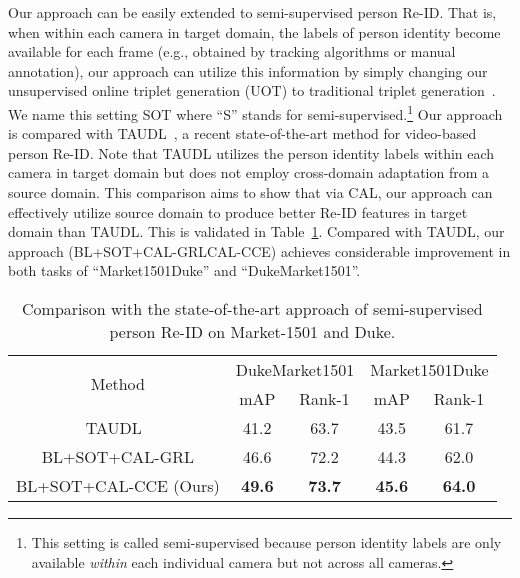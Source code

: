\documentclass[10pt,twocolumn,letterpaper]{article}
\begin{document}
Our approach can be easily extended to semi-supervised person Re-ID. That is, when within each camera in target domain, the labels of person identity become available for each frame (e.g., obtained by tracking algorithms or manual annotation), our approach can utilize this information by simply changing our unsupervised online triplet generation (UOT) to traditional triplet generation~\cite{hermans2017defense}. We name this setting SOT where ``S'' stands for semi-supervised.\footnote{This setting is called semi-supervised because person identity labels are only available \textit{within} each individual camera but not across all cameras.} Our approach is compared with TAUDL~\cite{Li_2018_ECCV}, a recent state-of-the-art method for video-based person Re-ID. Note that TAUDL utilizes the person identity labels within each camera in target domain but does not employ cross-domain adaptation from a source domain.
This comparison aims to show that via CAL, our approach can effectively utilize source domain to produce better Re-ID features in target domain than TAUDL. This is validated in Table~\ref{tab01}. Compared with TAUDL, our approach (BL+SOT+CAL-GRLCAL-CCE) achieves considerable improvement in both tasks of ``Market1501Duke'' and ``DukeMarket1501''. 


\begin{table}[htbp]
 \centering
 \caption{Comparison with the state-of-the-art approach of semi-supervised person Re-ID on Market-1501 and Duke.}
 \begin{adjustbox}{width=0.48\textwidth}
   \begin{tabular}{|c|cc|cc|}
   \toprule
   \multirow{2}[2]{*}{Method} & \multicolumn{2}{c|}{DukeMarket1501} & \multicolumn{2}{c|}{Market1501Duke} \\
\cmidrule{2-5}         & mAP  & Rank-1 & mAP  & Rank-1 \\
   \midrule
   TAUDL~\cite{Li_2018_ECCV} & 41.2 & 63.7 & 43.5 & 61.7 \\
   \midrule
BL+SOT+CAL-GRL & 46.6 & 72.2 & 44.3 & 62.0 \\
   BL+SOT+CAL-CCE (Ours) & \textcolor[rgb]{ 1, 0, 0}{\textbf{49.6}} & \textcolor[rgb]{ 1, 0, 0}{\textbf{73.7}} & \textcolor[rgb]{ 1, 0, 0}{\textbf{45.6}} & \textcolor[rgb]{ 1, 0, 0}{\textbf{64.0}} \\
   \bottomrule
   \end{tabular}\end{adjustbox}
 \label{tab01}\vspace*{-15pt}
\end{table}
\end{document}
